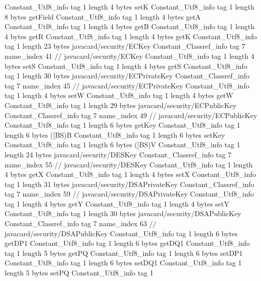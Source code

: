 {{{		}
		Constant_Utf8_info {
			tag	1
			length	4
			bytes	setK
		}
		Constant_Utf8_info {
			tag	1
			length	8
			bytes	getField
		}
		Constant_Utf8_info {
			tag	1
			length	4
			bytes	getA
		}
		Constant_Utf8_info {
			tag	1
			length	4
			bytes	getB
		}
		Constant_Utf8_info {
			tag	1
			length	4
			bytes	getR
		}
		Constant_Utf8_info {
			tag	1
			length	4
			bytes	getK
		}
		Constant_Utf8_info {
			tag	1
			length	23
			bytes	javacard/security/ECKey
		}
		Constant_Classref_info {
			tag	7
			name_index	41		// javacard/security/ECKey
		}
		Constant_Utf8_info {
			tag	1
			length	4
			bytes	setS
		}
		Constant_Utf8_info {
			tag	1
			length	4
			bytes	getS
		}
		Constant_Utf8_info {
			tag	1
			length	30
			bytes	javacard/security/ECPrivateKey
		}
		Constant_Classref_info {
			tag	7
			name_index	45		// javacard/security/ECPrivateKey
		}
		Constant_Utf8_info {
			tag	1
			length	4
			bytes	setW
		}
		Constant_Utf8_info {
			tag	1
			length	4
			bytes	getW
		}
		Constant_Utf8_info {
			tag	1
			length	29
			bytes	javacard/security/ECPublicKey
		}
		Constant_Classref_info {
			tag	7
			name_index	49		// javacard/security/ECPublicKey
		}
		Constant_Utf8_info {
			tag	1
			length	6
			bytes	getKey
		}
		Constant_Utf8_info {
			tag	1
			length	6
			bytes	([BS)B
		}
		Constant_Utf8_info {
			tag	1
			length	6
			bytes	setKey
		}
		Constant_Utf8_info {
			tag	1
			length	6
			bytes	([BS)V
		}
		Constant_Utf8_info {
			tag	1
			length	24
			bytes	javacard/security/DESKey
		}
		Constant_Classref_info {
			tag	7
			name_index	55		// javacard/security/DESKey
		}
		Constant_Utf8_info {
			tag	1
			length	4
			bytes	getX
		}
		Constant_Utf8_info {
			tag	1
			length	4
			bytes	setX
		}
		Constant_Utf8_info {
			tag	1
			length	31
			bytes	javacard/security/DSAPrivateKey
		}
		Constant_Classref_info {
			tag	7
			name_index	59		// javacard/security/DSAPrivateKey
		}
		Constant_Utf8_info {
			tag	1
			length	4
			bytes	getY
		}
		Constant_Utf8_info {
			tag	1
			length	4
			bytes	setY
		}
		Constant_Utf8_info {
			tag	1
			length	30
			bytes	javacard/security/DSAPublicKey
		}
		Constant_Classref_info {
			tag	7
			name_index	63		// javacard/security/DSAPublicKey
		}
		Constant_Utf8_info {
			tag	1
			length	6
			bytes	getDP1
		}
		Constant_Utf8_info {
			tag	1
			length	6
			bytes	getDQ1
		}
		Constant_Utf8_info {
			tag	1
			length	5
			bytes	getPQ
		}
		Constant_Utf8_info {
			tag	1
			length	6
			bytes	setDP1
		}
		Constant_Utf8_info {
			tag	1
			length	6
			bytes	setDQ1
		}
		Constant_Utf8_info {
			tag	1
			length	5
			bytes	setPQ
		}
		Constant_Utf8_info {
			tag	1
}}}
